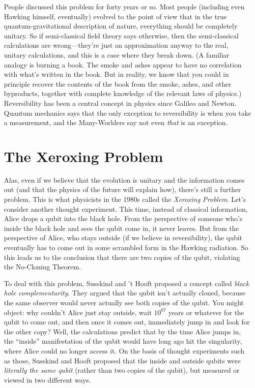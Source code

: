 \documentclass[11pt]{report}
\theoremstyle{plain}
\theoremstyle{definition}
\begin{document}
People discussed this problem for forty years or so.
Most people (including even Hawking himself, eventually) evolved to the point of view that in the true quantum-gravitational description of nature, everything should be
completely unitary. So if semi-classical field theory says otherwise, then
the semi-classical calculations are wrong---they're just an approximation anyway
to the real, unitary calculations, and this is a case where
they break down.
(A familiar analogy is burning a book. The smoke and ashes appear to have
no correlation with what's written in the book.  But
in reality, we know that you could in principle recover the contents of
the book from the smoke, ashes, and other byproducts, together with complete knowledge of the relevant laws of physics.)
Reversibility has been a central concept in physics since Galileo and Newton.  Quantum mechanics says that the only exception to reversibility
is when you take a measurement, and the Many-Worlders say
not even {\em that} is an exception.

\section{The Xeroxing Problem}

Alas, even if we believe that the evolution is unitary and the information comes out (and that the physics of the future will explain how),
there's still a further problem.
This is what physicists in the 1980s called
the {\em Xeroxing  Problem}.
Let's consider another thought experiment.
This time, instead of classical information, Alice drops a qubit into the
black hole.
From the perspective of someone who's inside the black hole and sees the qubit come in, it never
leaves.  But from the perspective of Alice, who stays outside
(if we believe in reversibility), the qubit
eventually has to come out in some scrambled form in the Hawking radiation.
So this leads us to the conclusion that there are
two copies of the qubit, violating the No-Cloning Theorem.

To deal with this problem, Susskind and 't Hooft proposed a concept called {\it black hole complementarity}.
They argued that the qubit isn't actually cloned, because the same observer
would never actually see both copies of the qubit.  You might object: why couldn't Alice just stay outside, wait $10^{67}$ years
or whatever for the qubit to come out, and then once it comes out, immediately
jump in and look for the other copy?
Well, the calculations predict that by the time Alice jumps in, the ``inside'' manifestation of the qubit
would have long ago hit the singularity, where Alice could no longer access it.
On the basis of thought experiments such as those, Susskind and Hooft proposed that the inside and outside qubits were
{\em literally the same qubit} (rather than two copies of the qubit), but measured or viewed in two different ways.
\end{document}

